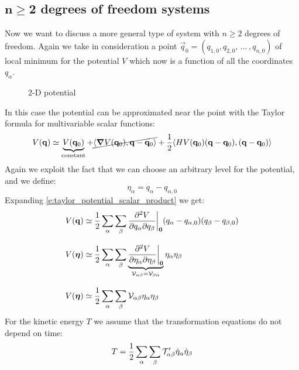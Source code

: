 \subsection{$\mathbf{n\geq 2}$ degrees of freedom systems}
Now we want to discuss a more general type of system with $n\geq2$ degrees of freedom. Again we take in consideration a point $\vec{q}_0 = (q_{1,0}, q_{2,0}, \,\dots\, ,q_{n,0})$ of local minimum for the potential $V$ which now is a function of all the coordinates $q_{\alpha}$.
\begin{figure}[!ht]
    \centering
    
    \caption{2-D potential}
    \label{fig:image11}
\end{figure}
In this case the potential can be approximated near the point with the Taylor formula for multivariable scalar functions:
\begin{equation} \label{e:taylor_potential_scalar_product}
    V(\vb{q}) \simeq \underbrace{V(\vb{q}_0)}_{\text{constant}} + \cancel{\langle \grad V(\vb{q}_0), \vb{q}-\vb{q}_0\rangle} + \dfrac{1}{2}\langle H V(\vb{q}_0)(\vb{q}-\vb{q}_0), (\vb{q}-\vb{q}_0)\rangle
\end{equation}
Again we exploit the fact that we can choose an arbitrary level for the potential, and we define:
\begin{equation}
    \eta_{\alpha} = q_{\alpha} - q_{\alpha,0}
\end{equation}
Expanding \eqref{e:taylor_potential_scalar_product} we get:
\begin{equation}
    \begin{split}
        V(\vb{q}) &\simeq \dfrac{1}{2}\displaystyle\sum_{\alpha}\displaystyle\sum_{\beta}\dfrac{\partial^2 V}{\partial q_{\alpha} \partial q_{\beta}}\bigg|_{\vb{0}}(q_{\alpha} - q_{\alpha,0})(q_{\beta} - q_{\beta,0})\\[8pt]
        V(\boldsymbol{\eta}) &\simeq \dfrac{1}{2}\displaystyle\sum_{\alpha}\displaystyle\sum_{\beta}\underbrace{\dfrac{\partial^2 V}{\partial \eta_{\alpha} \partial \eta_{\beta}}\bigg|_{\vb{0}}}_{\mathcal{V}_{\alpha \beta} = \mathcal{V}_{\beta \alpha}}\eta_{\alpha}\eta_{\beta}\\[8pt]
        V(\boldsymbol{\eta}) &\simeq \dfrac{1}{2}\displaystyle\sum_{\alpha}\displaystyle\sum_{\beta}\mathcal{V}_{\alpha \beta}\eta_{\alpha}\eta_{\beta}
    \end{split}
\end{equation}
For the kinetic energy $T$ we assume that the transformation equations do not depend on time:
\begin{equation}
    T = \dfrac{1}{2}\displaystyle\sum_{\alpha}\displaystyle\sum_{\beta}\mathcal{T}'_{\alpha \beta} \dot{\eta}_{\alpha}\dot{\eta}_{\beta}
\end{equation}

